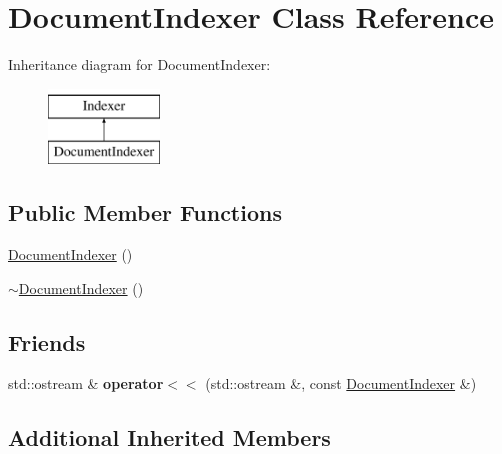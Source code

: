 \hypertarget{classDocumentIndexer}{\section{Document\-Indexer Class Reference}
\label{classDocumentIndexer}
}
Inheritance diagram for Document\-Indexer\-:\begin{figure}[H]
\begin{center}
\leavevmode
\includegraphics[height=2.000000cm]{classDocumentIndexer}
\end{center}
\end{figure}
\subsection*{Public Member Functions}
\begin{DoxyCompactItemize}
\item 
\hyperlink{classDocumentIndexer_a44f3c39ee50c32c0226fe98a66f71d07}{Document\-Indexer} ()
\item 
\hyperlink{classDocumentIndexer_aa3b39750a5477caa4aeab84f1c690c20}{$\sim$\-Document\-Indexer} ()
\end{DoxyCompactItemize}
\subsection*{Friends}
\begin{DoxyCompactItemize}
\item 
\hypertarget{classDocumentIndexer_a784b00aedd8ffb46de57ea05792250d8}{std\-::ostream \& {\bfseries operator$<$$<$} (std\-::ostream \&, const \hyperlink{classDocumentIndexer}{Document\-Indexer} \&)}\label{classDocumentIndexer_a784b00aedd8ffb46de57ea05792250d8}

\end{DoxyCompactItemize}
\subsection*{Additional Inherited Members}


